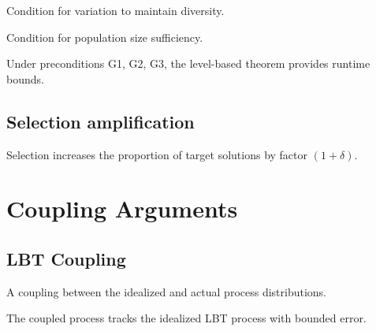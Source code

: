 \begin{definition}
  \label{def:precond_G2}
  Condition for variation to maintain diversity.
\end{definition}

\begin{definition}
  \label{def:precond_G3}
  Condition for population size sufficiency.
\end{definition}

\begin{theorem}
  \label{thm:linear_ranking}
  Under preconditions G1, G2, G3, the level-based theorem provides runtime bounds.
  \leanok
\end{theorem}

\section{Selection amplification}
\begin{lemma}
  \label{lem:sel_amplification}
  Selection increases the proportion of target solutions by factor $(1 + \delta)$.
  \notready
\end{lemma}

\chapter{Coupling Arguments}

\section{LBT Coupling}
\begin{definition}[Coupling]
  \label{def:coupling}
  A coupling between the idealized and actual process distributions.
\end{definition}

\begin{theorem}
  \label{thm:lbt_coupling}
  The coupled process tracks the idealized LBT process with bounded error.
  \notready
\end{theorem}

